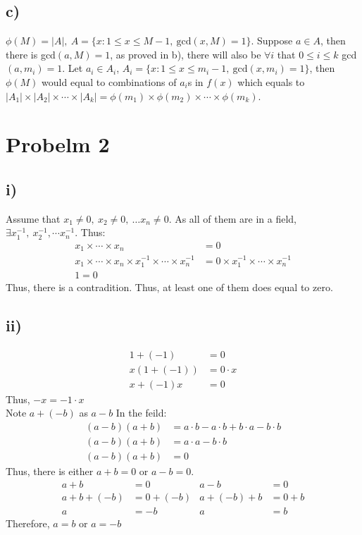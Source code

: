 \documentclass{article}
\begin{document}
\subsection*{c)}
\(\phi(M)=|A|,\ A = \{x:1\leqslant x\leqslant M-1,\ \text{gcd}(x,M)=1\}\). Suppose \(a\in A\), then there is
gcd\((a,M)=1\), as proved in b), there will also be \(\forall i\) that \(0\leqslant i \leqslant k\) gcd\((a,m_i)=1\).
Let \(a_i\in A_i\), \(A_i = \{x:1\leqslant x\leqslant m_i-1,\ \text{gcd}(x,m_i)=1\}\), then \(\phi(M)\) would equal to combinations of \(a_i\)s in \(f(x)\) which
equals to \(|A_1|\times |A_2|\times \cdots \times |A_k|=\phi(m_1)\times \phi(m_2)\times \cdots \times \phi(m_k)\).
\section*{Probelm 2}


\subsection*{i)}
Assume that \(x_1\neq 0,\ x_2\neq0,\ \dots x_n\neq0\). As all of them are in a field, 
\(\exists x_1^{-1},\ x_2^{-1},\cdots x_n^{-1}\). Thus:
\begin{align*}
    x_1\times \cdots \times x_n&=0\\
    x_1\times \cdots \times x_n\times x^{-1}_1\times \cdots \times x_n^{-1}&=0\times x^{-1}_1\times \cdots \times x_n^{-1}\\
    1=0
\end{align*}
Thus, there is a contradition. Thus, at least one of them does equal to zero.
\subsection*{ii)}
\begin{align*}
    1+(-1)&=0\\
    x(1+(-1))&=0\cdot x\\
    x+(-1)x &= 0
\end{align*}
Thus, \(-x = -1\cdot x\)\\
Note \(a+(-b)\) as \(a-b\)
In the feild:
\begin{align*}
    (a-b)(a+b)&=a\cdot b-a\cdot b +b\cdot a -b\cdot b\\
    (a-b)(a+b)&=a\cdot a - b\cdot b\\
    (a-b)(a+b)&=0
\end{align*}
Thus, there is either \(a+b=0\) or \(a-b = 0\).
\begin{align*}
    a+b&=0&a-b &= 0\\
    a+b+(-b)&=0+(-b)&a+(-b)+b&=0+b\\
    a&=-b&a&=b
\end{align*}
Therefore, \(a=b\) or \(a=-b\)
\end{document}
